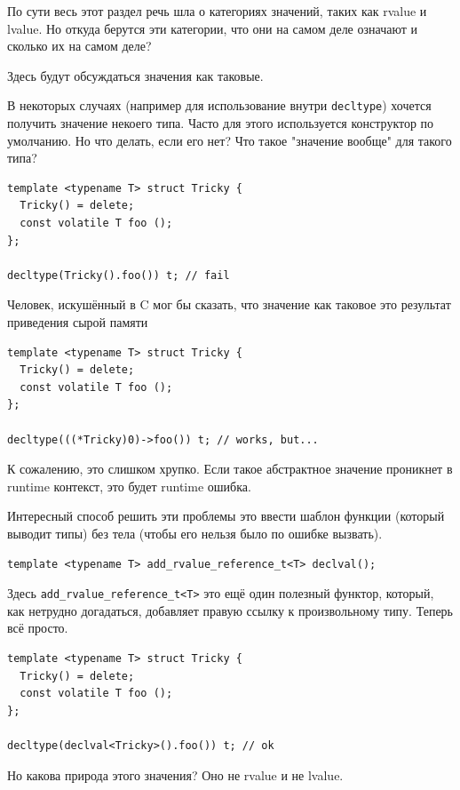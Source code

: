 \documentclass[a4paper,12pt,oneside]{article}
\begin{document}
По сути весь этот раздел речь шла о категориях значений, таких как rvalue и lvalue. Но откуда берутся эти категории, что они на самом деле означают и сколько их на самом деле?

Здесь будут обсуждаться значения как таковые.

В некоторых случаях (например для использование внутри \lstinline!decltype!) хочется получить значение некоего типа. Часто для этого используется конструктор по умолчанию. Но что делать, если его нет? Что такое "значение вообще" для такого типа?

\begin{lstlisting}
template <typename T> struct Tricky {
  Tricky() = delete;
  const volatile T foo ();
};

decltype(Tricky().foo()) t; // fail
\end{lstlisting}

Человек, искушённый в C мог бы сказать, что значение как таковое это результат приведения сырой памяти

\begin{lstlisting}
template <typename T> struct Tricky {
  Tricky() = delete;
  const volatile T foo ();
};

decltype(((*Tricky)0)->foo()) t; // works, but...
\end{lstlisting}

К сожалению, это слишком хрупко. Если такое абстрактное значение проникнет в runtime контекст, это будет runtime ошибка.

Интересный способ решить эти проблемы это ввести шаблон функции (который выводит типы) без тела (чтобы его нельзя было по ошибке вызвать).

\begin{lstlisting}
template <typename T> add_rvalue_reference_t<T> declval();
\end{lstlisting}

Здесь \lstinline!add_rvalue_reference_t<T>! это ещё один полезный функтор, который, как нетрудно догадаться, добавляет правую ссылку к произвольному типу. Теперь всё просто.

\begin{lstlisting}
template <typename T> struct Tricky {
  Tricky() = delete;
  const volatile T foo ();
};

decltype(declval<Tricky>().foo()) t; // ok
\end{lstlisting}

Но какова природа этого значения? Оно не rvalue и не lvalue.
\end{document}
